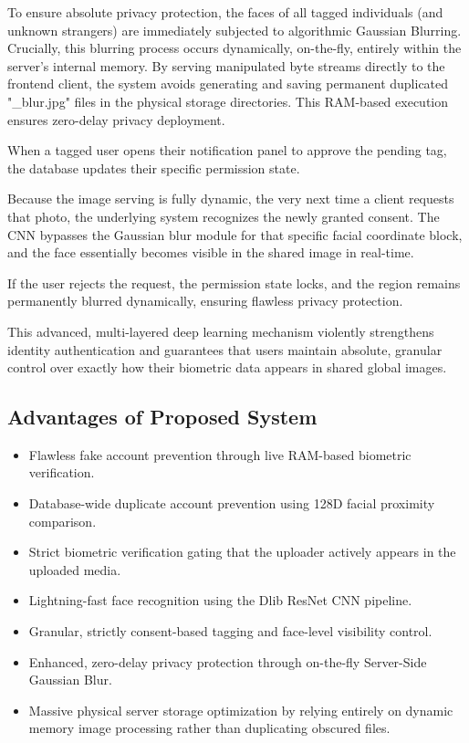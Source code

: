 To ensure absolute privacy protection, the faces of all tagged individuals (and unknown strangers) are immediately subjected to algorithmic Gaussian Blurring. Crucially, this blurring process occurs dynamically, on-the-fly, entirely within the server's internal memory. By serving manipulated byte streams directly to the frontend client, the system avoids generating and saving permanent duplicated "\_blur.jpg" files in the physical storage directories. This RAM-based execution ensures zero-delay privacy deployment.

When a tagged user opens their notification panel to approve the pending tag, the database updates their specific permission state. 

Because the image serving is fully dynamic, the very next time a client requests that photo, the underlying system recognizes the newly granted consent. The CNN bypasses the Gaussian blur module for that specific facial coordinate block, and the face essentially becomes visible in the shared image in real-time.

If the user rejects the request, the permission state locks, and the region remains permanently blurred dynamically, ensuring flawless privacy protection.

This advanced, multi-layered deep learning mechanism violently strengthens identity authentication and guarantees that users maintain absolute, granular control over exactly how their biometric data appears in shared global images.

\subsection{Advantages of Proposed System}

\begin{itemize}
\item Flawless fake account prevention through live RAM-based biometric verification.
\item Database-wide duplicate account prevention using 128D facial proximity comparison.
\item Strict biometric verification gating that the uploader actively appears in the uploaded media.
\item Lightning-fast face recognition using the Dlib ResNet CNN pipeline.
\item Granular, strictly consent-based tagging and face-level visibility control.
\item Enhanced, zero-delay privacy protection through on-the-fly Server-Side Gaussian Blur.
\item Massive physical server storage optimization by relying entirely on dynamic memory image processing rather than duplicating obscured files.
\end{itemize}

